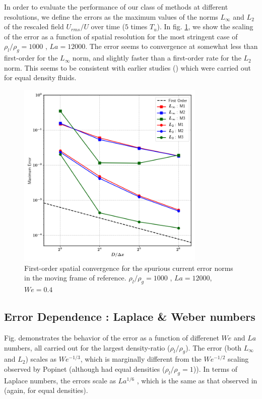 In order to evaluate the performance of our class of methods at different resolutions, we define the errors as the maximum values of the norms $L_\infty$ and $L_2$ of the rescaled field $U_{rms}/U$ over time ($5$ times $T_u$). In fig. \ref{moving_drop_conv}, we show the scaling of the error as a function of spatial resolution for the most stringent case of $\rho_l/\rho_g = 1000 $ , $La = 12000$. The error seems to convergence at somewhat less than first-order for the $L_\infty$ norm, and slightly faster than a first-order rate for the $L_2$ norm. This seems to be consistent with earlier studies (\cite{popinet2009accurate}) which were carried out for equal density fluids. 
\begin{figure}[h!]
    \centering
    \includegraphics[width = 0.8\textwidth]{plots/droplet_advect/convergence_all.png}
    \caption{First-order spatial convergence for the spurious current error norms in the moving frame of reference. $\rho_l/\rho_g = 1000 $ , $La = 12000$, $We = 0.4$ }   
    \label{moving_drop_conv}
\end{figure}

\subsection*{Error Dependence : Laplace \& Weber numbers}

Fig. demonstrates the behavior of the error as a function of differenet $We$ and $La$ numbers, all carried out for the largest density-ratio ($\rho_l/\rho_g$). The error (both $L_\infty$ and $L_2$) scales as $We^{-1/3}$, which is marginally different from the $We^{-1/2}$ scaling observed by Popinet \cite{popinet2009accurate} (although \cite{popinet2009accurate} had equal densities ($\rho_l/\rho_g = 1$)). In terms of Laplace numbers, the errors scale as $La^{1/6}$ , which is the same as that observed in \cite{popinet2009accurate} (again, for equal densities).




